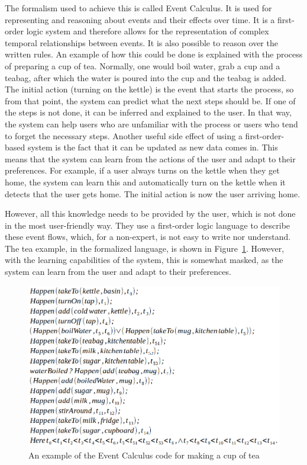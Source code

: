 \documentclass[11pt,a4paper]{report}
\begin{document}
The formalism used to achieve this is called Event Calculus. It is used for representing and reasoning about events and their effects over time. It is a first-order logic system and therefore allows for the representation of complex temporal relationships between events. It is also possible to reason over the written rules. An example of how this could be done is explained with the process of preparing a cup of tea. Normally, one would boil water, grab a cup and a teabag, after which the water is poured into the cup and the teabag is added. The initial action (turning on the kettle) is the event that starts the process, so from that point, the system can predict what the next steps should be. If one of the steps is not done, it can be inferred and explained to the user. In that way, the system can help users who are unfamiliar with the process or users who tend to forget the necessary steps. Another useful side effect of using a first-order-based system is the fact that it can be updated as new data comes in. This means that the system can learn from the actions of the user and adapt to their preferences. For example, if a user always turns on the kettle when they get home, the system can learn this and automatically turn on the kettle when it detects that the user gets home. The initial action is now the user arriving home.

However, all this knowledge needs to be provided by the user, which is not done in the most user-friendly way. They use a first-order logic language to describe these event flows, which, for a non-expert, is not easy to write nor understand. The tea example, in the formalized language, is shown in Figure~\ref{fig:event_code}. However, with the learning capabilities of the system, this is somewhat masked, as the system can learn from the user and adapt to their preferences.

\begin{figure}
    \centering
    \includegraphics[width=0.8\linewidth]{images/event_code.png}
    \caption{An example of the Event Calculus code for making a cup of tea~\cite{SOTA_EventCalculus}}
    \label{fig:event_code}
\end{figure}
\end{document}
